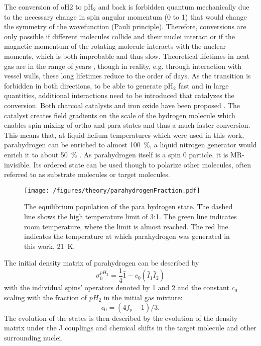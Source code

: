             The conversion of oH2 to pH$_2$ and back is forbidden quantum mechanically due to the necessary change in spin angular momentum (0 to 1) that would change the symmetry of the wavefunction (Pauli principle)\cite{minaev_spin_1995}. Therefore, conversions are only possible if different molecules collide and their nuclei interact or if the magnetic momentum of the rotating molecule interacts with the nuclear moments, which is both improbable and thus slow. Theoretical lifetimes in neat gas are in the range of years \cite{green_theory_2012-1}, though in reality, e.g. through interaction with vessel walls, these long lifetimes reduce to the order of days. As the transition is forbidden in both directions, to be able to generate pH$_2$ fast and in large quantities, additional interactions need to be introduced that catalyzes the conversion. Both charcoal catalysts and iron oxide have been proposed \cite{dechent_proton_nodate}. The catalyst creates field gradients on the scale of the hydrogen molecule which enables spin mixing of ortho and para states\cite{minaev_spin_1995} and thus a much faster conversion. This means that, at liquid helium temperatures which were used in this work, parahydrogen can be enriched to almost \SI{100}{\%}, a liquid nitrogen generator would enrich it to about \SI{50}{\%} \cite{zhuzhgov_low-temperature_2018}.
            As parahydrogen itself is a spin 0 particle, it is MR-invisible. Its ordered state can be used though to polarize other molecules, often referred to as substrate molecules or target molecules.
            \begin{figure}
                \centering
                \texttt{[image: /figures/theory/parahydrogenFraction.pdf]}
                \caption[Parahydrogen fraction]{The equilibrium population of the para hydrogen state. The dashed line shows the high temperature limit of 3:1. The green line indicates room temperature, where the limit is almost reached. The red line indicates the temperature at which parahydrogen was generated in this work, \SI{21}{\kelvin}.}
                \label{figure:theory:ph2Fraction}
            \end{figure}
            The initial density matrix of parahydrogen can be described by
            \begin{equation}
                \sigma_0^{pH_2} = \frac{1}{4} \hat 1 - c_0(\hat{I}_1\hat{I}_2)
            \end{equation}
            with the individual spins' operators denoted by 1 and 2 \cite{green_theory_2012-1} and the constant $c_0$ scaling with the fraction of $pH_2$ in the initial gas mixture:
            \begin{equation*}
                c_0=(4f_p-1)/3.
            \end{equation*}
            The evolution of the states is then described by the evolution of the density matrix under the J couplings and chemical shifts in the target molecule and other surrounding nuclei. 
